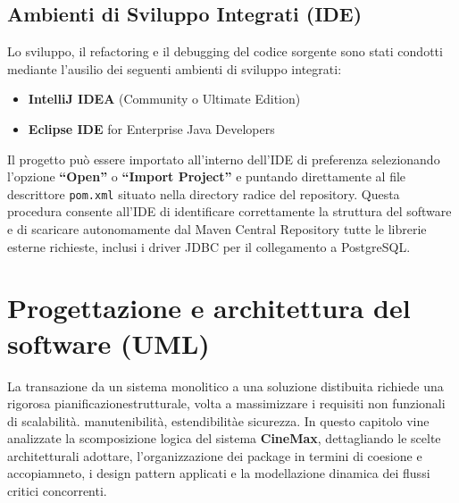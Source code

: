 \documentclass{article}
\begin{document}
\subsection{Ambienti di Sviluppo Integrati (IDE)}
Lo sviluppo, il refactoring e il debugging del codice sorgente sono stati condotti mediante l'ausilio dei seguenti ambienti di sviluppo integrati:
\begin{itemize}
    \item \textbf{IntelliJ IDEA} (Community o Ultimate Edition)
    \item \textbf{Eclipse IDE} for Enterprise Java Developers
\end{itemize}
Il progetto può essere importato all'interno dell'IDE di preferenza selezionando l'opzione \textbf{``Open''} o \textbf{``Import Project''} e puntando direttamente al file descrittore \texttt{pom.xml} situato nella directory radice del repository. Questa procedura consente all'IDE di identificare correttamente la struttura del software e di scaricare autonomamente dal Maven Central Repository tutte le librerie esterne richieste, inclusi i driver JDBC per il collegamento a PostgreSQL.

\section{Progettazione e architettura del software (UML)}
La transazione da un sistema monolitico a una soluzione distibuita richiede una rigorosa pianificazionestrutturale, volta a massimizzare i requisiti non funzionali di scalabilità. manutenibilità, estendibilitàe sicurezza. In questo capitolo vine analizzate la scomposizione logica del sistema \textbf{CineMax}, dettagliando le scelte architetturali adottare, l'organizzazione dei package in termini di coesione e accopiamneto, i design pattern applicati e la modellazione dinamica dei flussi critici concorrenti.
\end{document}
